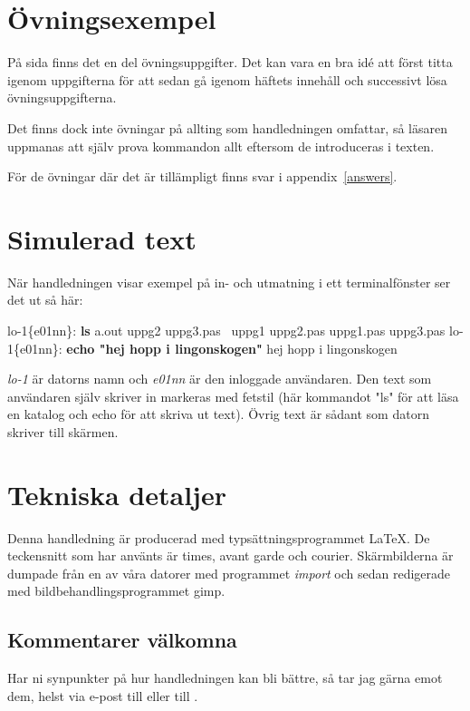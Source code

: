 \documentclass[a4paper,twocolumn]{book}
\begin{document}
\section*{Övningsexempel}

På sida \pageref{cha:uppgifter} finns det en del övningsuppgifter.
Det kan vara en bra idé att först titta igenom uppgifterna för att sedan
gå igenom häftets innehåll och successivt lösa övningsuppgifterna.

Det finns dock inte övningar på
allting som handledningen omfattar, så läsaren uppmanas att själv
prova kommandon allt eftersom de introduceras i texten.

För de övningar där det är tillämpligt finns svar i
appendix~\ref{answers}.

\section*{Simulerad text}

När handledningen visar exempel på in- och utmatning i ett
terminalfönster ser det ut så här:
\begin{example}
lo-1\{e01nn\}: \textbf{ls}              
a.out        uppg2        uppg3.pas~
uppg1        uppg2.pas
uppg1.pas    uppg3.pas
lo-1\{e01nn\}: \textbf{echo "hej hopp i lingonskogen"}
hej hopp i lingonskogen
\end{example}
\emph{lo-1} är datorns namn och \emph{e01nn} är den inloggade användaren. Den text som användaren själv skriver in markeras med fetstil (här kommandot "ls" för att läsa en katalog och echo för att skriva ut text). Övrig text är sådant som datorn skriver till skärmen.

\section*{Tekniska detaljer}

Denna handledning är producerad med typsättningsprogrammet \LaTeX. De
teckensnitt som har använts är times, avant garde och courier.
Skärmbilderna är dumpade från en av våra datorer med programmet
\emph{import} och sedan redigerade med bildbehandlingsprogrammet gimp.

\subsection*{Kommentarer välkomna}

Har ni synpunkter på hur handledningen kan bli bättre, så tar jag
gärna emot dem, helst via e-post till  eller till
.
\end{document}
